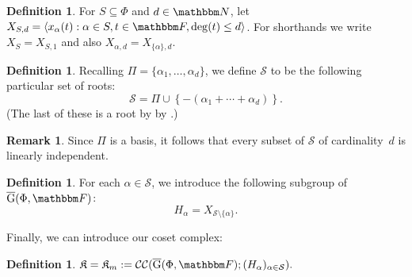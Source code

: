 \documentclass[10pt,a4paper]{article}
\theoremstyle{definition}
\newtheorem{definition}[theorem]{Definition}
\newtheorem{remark}[theorem]{Remark}
\newcommand{\N}{\mathbbm N}
\newcommand{\F}{\mathbbm F}
\newcommand{\ol}[1]{\overline{#1}}
\newcommand{\calS}{\mathcal{S}}
\newcommand{\CC}[2]{\mathcal{C}\mathcal{C}(#1;#2)}
\newcommand{\Gu}[2]{\ol{\mathrm{G}}(#1,#2)}
\newcommand{\complex}{\mathfrak{K}}
\begin{document}
\begin{definition}
    For $S \subseteq \Phi$ and $d \in \N$, let $X_{S,d} = \langle x_\alpha(t) : \alpha \in S, t \in \F, \deg(t) \le d \rangle$. For shorthands we write $X_S = X_{S,1}$ and also $X_{\alpha,d} = X_{\{\alpha\},d}$.
\end{definition}

\begin{definition}\label{def:rootchoice}
    Recalling $\Pi = \{\alpha_1, \dots, \alpha_d\}$, we define  $\calS$ to be the following particular set of roots:
     \begin{equation}   \label{eqn:ourS}
        \calS = \Pi \cup \left\{-(\alpha_1 + \cdots + \alpha_d)\right\}.
     \end{equation}
     (The last of these is a root by by .)
\end{definition}

\begin{remark}  \label{rem:matr}
    Since $\Pi$ is a basis, it follows that every subset of $\calS$ of cardinality~$d$ is linearly independent.
\end{remark}

\begin{definition}
    For each $\alpha \in \calS$, we introduce the following subgroup of $\Gu{\Phi}{\F}$:
    \[
        H_\alpha= X_{\calS \setminus \{ \alpha\}}.
    \]
\end{definition}

Finally, we can introduce our coset complex:
\begin{definition}
    $\displaystyle \complex = \complex_m := \CC{\Gu{\Phi}{\F}}{(H_\alpha)_{\alpha \in \calS}}.$
\end{definition}
\end{document}
